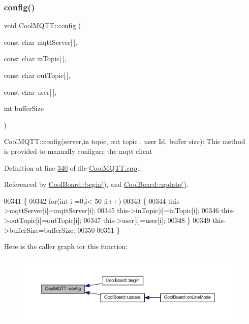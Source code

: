 \subsubsection{\texorpdfstring{config()}{config()}\hspace{0.1cm}{\footnotesize\ttfamily [1/2]}}
{\footnotesize\ttfamily void Cool\+M\+Q\+T\+T\+::config (\begin{DoxyParamCaption}\item[{const char}]{mqtt\+Server\mbox{[}$\,$\mbox{]},  }\item[{const char}]{in\+Topic\mbox{[}$\,$\mbox{]},  }\item[{const char}]{out\+Topic\mbox{[}$\,$\mbox{]},  }\item[{const char}]{user\mbox{[}$\,$\mbox{]},  }\item[{int}]{buffer\+Size }\end{DoxyParamCaption})}

Cool\+M\+Q\+T\+T\+::config(server,in topic, out topic , user Id, buffer size)\+: This method is provided to manually configure the mqtt client 

Definition at line \hyperlink{_cool_m_q_t_t_8cpp_source_l00340}{340} of file \hyperlink{_cool_m_q_t_t_8cpp_source}{Cool\+M\+Q\+T\+T.\+cpp}.



Referenced by \hyperlink{_cool_board_8cpp_source_l00021}{Cool\+Board\+::begin()}, and \hyperlink{_cool_board_8cpp_source_l00411}{Cool\+Board\+::update()}.


\begin{DoxyCode}
00341 \{
00342     \textcolor{keywordflow}{for}(\textcolor{keywordtype}{int} i =0;i< 50 ;i++)
00343     \{
00344         this->mqttServer[i]=mqttServer[i];
00345         this->inTopic[i]=inTopic[i];
00346         this->outTopic[i]=outTopic[i];
00347         this->user[i]=user[i];
00348     \}
00349     this->bufferSize=bufferSize;
00350 
00351 \}
\end{DoxyCode}
Here is the caller graph for this function\+:
\nopagebreak
\begin{figure}[H]
\begin{center}
\leavevmode
\includegraphics[width=350pt]{class_cool_m_q_t_t_a9b703de4f1358f0ee7a5e8c44979c648_icgraph}
\end{center}
\end{figure}
\mbox{\label{class_cool_m_q_t_t_a6571671781a505feca9a8a56e256c6bc}} 
